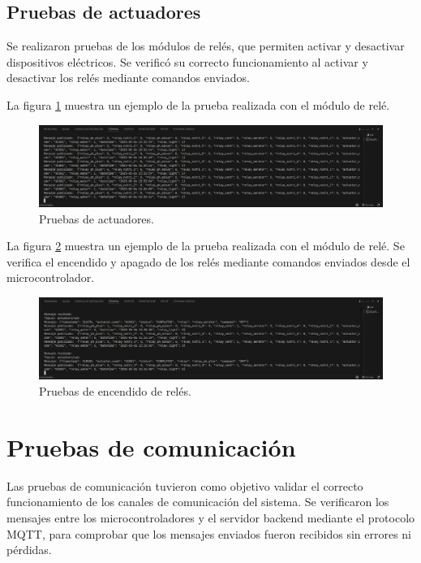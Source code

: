 \subsection{Pruebas de actuadores}

Se realizaron pruebas de los módulos de relés, que permiten activar y
desactivar dispositivos eléctricos. Se verificó su correcto funcionamiento al
activar y desactivar los relés mediante comandos enviados.

La figura \ref{fig:prueba_rele_1} muestra un ejemplo de la prueba realizada con
el módulo de relé.

\begin{figure}[H]
    \centering
    \includegraphics[width=\textwidth]{Images/54_actuadores.png}
    \caption[Pruebas de actuadores]{Pruebas de actuadores.}
    \label{fig:prueba_rele_1}
\end{figure}

La figura \ref{fig:prueba_rele_2} muestra un ejemplo de la prueba realizada con
el módulo de relé. Se verifica el encendido y apagado de los relés mediante
comandos enviados desde el microcontrolador.

\begin{figure}[H]
    \centering
    \includegraphics[width=\textwidth]{Images/54_actuadores_activacion.png}
    \caption[Pruebas de encendido de relés]{Pruebas de encendido de relés.}
    \label{fig:prueba_rele_2}
\end{figure}

\section{Pruebas de comunicación}

Las pruebas de comunicación tuvieron como objetivo validar el correcto
funcionamiento de los canales de comunicación del sistema. Se verificaron los
mensajes entre los microcontroladores y el servidor backend mediante el
protocolo MQTT, para comprobar que los mensajes enviados fueron recibidos sin
errores ni pérdidas.

